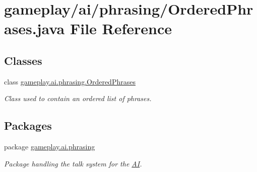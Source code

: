 \hypertarget{a00049}{\section{gameplay/ai/phrasing/\-Ordered\-Phrases.java File Reference}
\label{a00049}
}
\subsection*{Classes}
\begin{DoxyCompactItemize}
\item 
class \hyperlink{a00016}{gameplay.\-ai.\-phrasing.\-Ordered\-Phrases}
\begin{DoxyCompactList}\small\item\em Class used to contain an ordered list of phrases. \end{DoxyCompactList}\end{DoxyCompactItemize}
\subsection*{Packages}
\begin{DoxyCompactItemize}
\item 
package \hyperlink{a00084}{gameplay.\-ai.\-phrasing}
\begin{DoxyCompactList}\small\item\em Package handling the talk system for the \hyperlink{a00001}{A\-I}. \end{DoxyCompactList}\end{DoxyCompactItemize}
